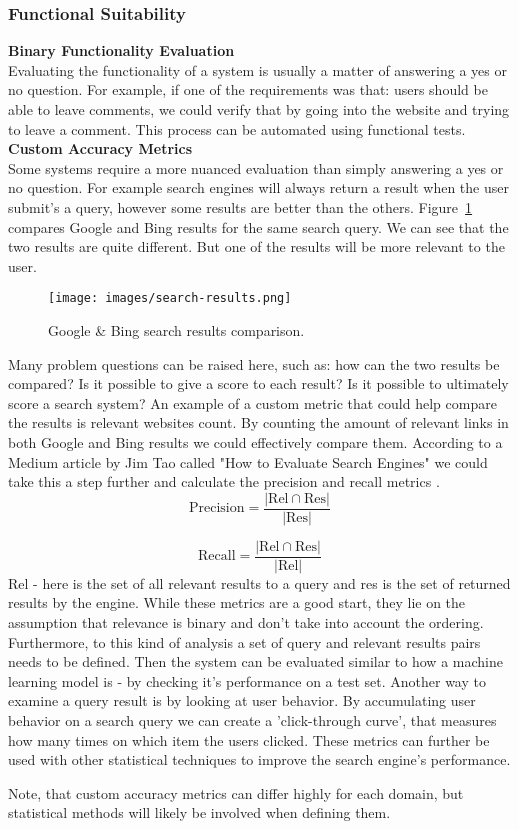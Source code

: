 \documentclass[12pt]{article}
\begin{document}
\subsubsection{Functional Suitability}
\textbf{Binary Functionality Evaluation}\\
Evaluating the functionality of a system is usually a matter of answering a yes or no question. For example, if one of the requirements was that: users should be able to leave comments, we could verify that by going into the website and trying to leave a comment. This process can be automated using functional tests. 
\\\textbf{Custom Accuracy Metrics}\\
Some systems require a more nuanced evaluation than simply answering a yes or no question. For example search engines will always return a result when the user submit's a query, however some results are better than the others. Figure~\ref{fig:search-results} compares Google and Bing results for the same search query. We can see that the two results are quite different. But one of the results will be more relevant to the user.
\begin{figure}[H]
    \centering
    \texttt{[image: images/search-results.png]}
    \caption{Google \& Bing search results comparison.}
    \label{fig:search-results}
\end{figure}
Many problem questions can be raised here, such as: how can the two results be compared? Is it possible to give a score to each result? Is it possible to ultimately score a search system?
An example of a custom metric that could help compare the results is relevant websites count. By counting the amount of relevant links in both Google and Bing results we could effectively compare them. According to a Medium article by Jim Tao called "How to Evaluate Search Engines" we could take this a step further and calculate the precision and recall metrics \cite{Tao19}.
\[
\text{Precision} = \frac{| \text{Rel} \cap \text{Res} |}{| \text{Res} |}
\]

\[
\text{Recall} = \frac{| \text{Rel} \cap \text{Res} |}{| \text{Rel} |}
\]
Rel - here is the set of all relevant results to a query and res is the set of returned results by the engine. While these metrics are a good start, they lie on the assumption that relevance is binary and don't take into account the ordering. Furthermore, to this kind of analysis a set of query and relevant results pairs needs to be defined. Then the system can be evaluated similar to how a machine learning model is - by checking it's performance on a test set. Another way to examine a query result is by looking at user behavior. By accumulating user behavior on a search query we can create a 'click-through curve', that measures how many times on which item the users clicked. These metrics can further be used with other statistical techniques to improve the search engine's performance. \par
Note, that custom accuracy metrics can differ highly for each domain, but statistical methods will likely be involved when defining them.
\end{document}
